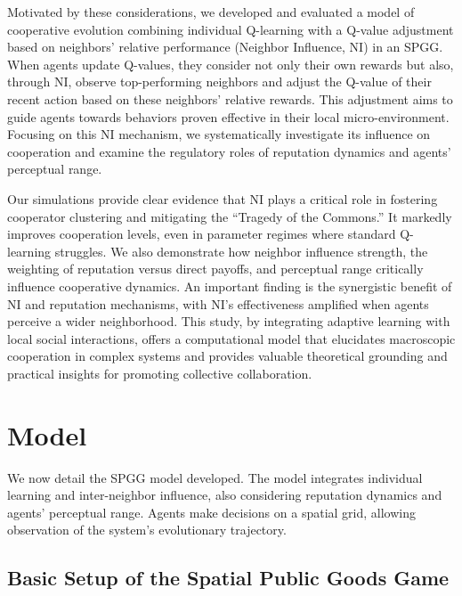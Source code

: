 \documentclass[preprint,number,sort&compress,12pt]{elsarticle}
\begin{document}
Motivated by these considerations, we developed and evaluated a model of cooperative evolution combining individual Q-learning with a Q-value adjustment based on neighbors' relative performance (Neighbor Influence, NI) in an SPGG. When agents update Q-values, they consider not only their own rewards but also, through NI, observe top-performing neighbors and adjust the Q-value of their recent action based on these neighbors' relative rewards. This adjustment aims to guide agents towards behaviors proven effective in their local micro-environment. Focusing on this NI mechanism, we systematically investigate its influence on cooperation and examine the regulatory roles of reputation dynamics and agents' perceptual range.

Our simulations provide clear evidence that NI plays a critical role in fostering cooperator clustering and mitigating the ``Tragedy of the Commons.'' It markedly improves cooperation levels, even in parameter regimes where standard Q-learning struggles. We also demonstrate how neighbor influence strength, the weighting of reputation versus direct payoffs, and perceptual range critically influence cooperative dynamics. An important finding is the synergistic benefit of NI and reputation mechanisms, with NI’s effectiveness amplified when agents perceive a wider neighborhood. This study, by integrating adaptive learning with local social interactions, offers a computational model that elucidates macroscopic cooperation in complex systems and provides valuable theoretical grounding and practical insights for promoting collective collaboration.

\section{Model}
\label{sec:model}

We now detail the SPGG model developed. The model integrates individual learning and inter-neighbor influence, also considering reputation dynamics and agents' perceptual range. Agents make decisions on a spatial grid, allowing observation of the system's evolutionary trajectory.

\subsection{Basic Setup of the Spatial Public Goods Game}
\end{document}
